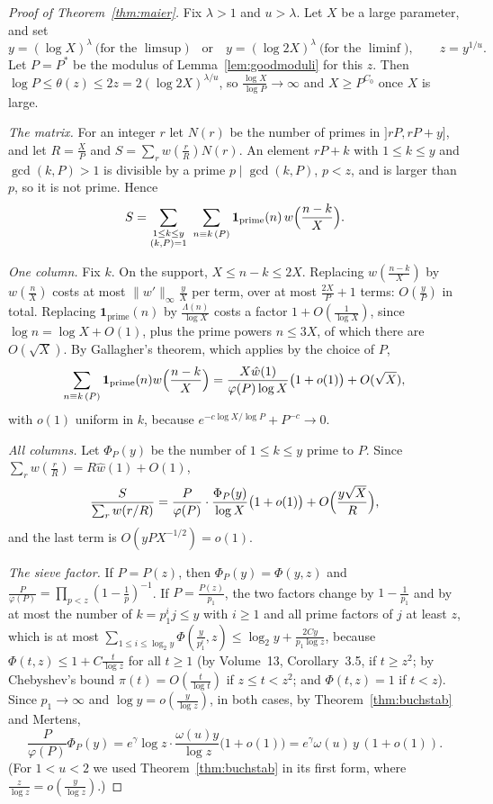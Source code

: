 \begin{proof}[Proof of Theorem~\ref{thm:maier}]
Fix $\lambda>1$ and $u>\lambda$. Let $X$ be a large parameter, and set
\[
y=(\log X)^\lambda\ \text{(for the }\limsup\text{)}\quad\text{or}\quad y=(\log2X)^\lambda\ \text{(for the }\liminf\text{)},\qquad z=y^{1/u}.
\]
Let $P=P^*$ be the modulus of Lemma~\ref{lem:goodmoduli} for this $z$. Then $\log P\le\theta(z)\le2z=2(\log2X)^{\lambda/u}$, so $\frac{\log X}{\log P}\to\infty$ and $X\ge P^{C_0}$ once $X$ is large.

\emph{The matrix.} For an integer $r$ let $N(r)$ be the number of primes in $]rP,rP+y]$, and let $R=\frac XP$ and $S=\sum_rw(\frac rR)N(r)$. An element $rP+k$ with $1\le k\le y$ and $\gcd(k,P)>1$ is divisible by a prime $p\mid\gcd(k,P)$, $p<z$, and is larger than $p$, so it is not prime. Hence
\[
S=\sum_{\substack{1\le k\le y\\(k,P)=1}}\ \sum_{n\equiv k\,(P)}\mathbf 1_{\text{prime}}(n)\,w\Bigl(\frac{n-k}{X}\Bigr).
\]

\emph{One column.} Fix $k$. On the support, $X\le n-k\le2X$. Replacing $w(\frac{n-k}X)$ by $w(\frac nX)$ costs at most $\|w'\|_\infty\frac yX$ per term, over at most $\frac{2X}P+1$ terms: $O(\frac yP)$ in total. Replacing $\mathbf 1_{\text{prime}}(n)$ by $\frac{\Lambda(n)}{\log X}$ costs a factor $1+O(\frac1{\log X})$, since $\log n=\log X+O(1)$, plus the prime powers $n\le3X$, of which there are $O(\sqrt X)$. By Gallagher's theorem, which applies by the choice of $P$,
\[
\sum_{n\equiv k\,(P)}\mathbf 1_{\text{prime}}(n)w\Bigl(\frac{n-k}X\Bigr)=\frac{X\hat w(1)}{\varphi(P)\log X}\bigl(1+o(1)\bigr)+O(\sqrt X),
\]
with $o(1)$ uniform in $k$, because $e^{-c\log X/\log P}+P^{-c}\to0$.

\emph{All columns.} Let $\Phi_P(y)$ be the number of $1\le k\le y$ prime to $P$. Since $\sum_rw(\frac rR)=R\hat w(1)+O(1)$,
\[
\frac{S}{\sum_rw(r/R)}=\frac{P}{\varphi(P)}\cdot\frac{\Phi_P(y)}{\log X}\bigl(1+o(1)\bigr)+O\Bigl(\frac{y\sqrt X}{R}\Bigr),
\]
and the last term is $O(yP X^{-1/2})=o(1)$.

\emph{The sieve factor.} If $P=P(z)$, then $\Phi_P(y)=\Phi(y,z)$ and $\frac P{\varphi(P)}=\prod_{p<z}(1-\frac1p)^{-1}$. If $P=\frac{P(z)}{p_1}$, the two factors change by $1-\frac1{p_1}$ and by at most the number of $k=p_1^ij\le y$ with $i\ge1$ and all prime factors of $j$ at least $z$, which is at most $\sum_{1\le i\le\log_2y}\Phi(\frac y{p_1^i},z)\le\log_2y+\frac{2Cy}{p_1\log z}$, because $\Phi(t,z)\le1+C\frac t{\log z}$ for all $t\ge1$ (by Volume~13, Corollary~3.5, if $t\ge z^2$; by Chebyshev's bound $\pi(t)=O(\frac t{\log t})$ if $z\le t<z^2$; and $\Phi(t,z)=1$ if $t<z$). Since $p_1\to\infty$ and $\log y=o(\frac y{\log z})$, in both cases, by Theorem~\ref{thm:buchstab} and Mertens,
\[
\frac P{\varphi(P)}\Phi_P(y)=e^\gamma\log z\cdot\frac{\omega(u)y}{\log z}\bigl(1+o(1)\bigr)=e^\gamma\omega(u)\,y\,(1+o(1)).
\]
(For $1<u<2$ we used Theorem~\ref{thm:buchstab} in its first form, where $\frac z{\log z}=o(\frac y{\log z})$.)


\end{proof}
